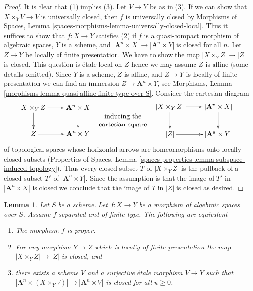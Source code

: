 \documentclass{stacks-project}
\theoremstyle{plain}
\newtheorem{lemma}[subsection]{Lemma}
\theoremstyle{definition}
\theoremstyle{remark}
\numberwithin{equation}{subsection}
\begin{document}
\begin{proof}
\medskip\noindent
It is clear that (1) implies (3). Let $V \to Y$ be as in (3).
If we can show that $X \times_Y V \to V$ is universally closed,
then $f$ is universally closed by
Morphisms of Spaces, Lemma
\ref{spaces-morphisms-lemma-universally-closed-local}.
Thus it suffices to show that $f : X \to Y$ satisfies (2)
if $f$ is a quasi-compact morphism of algebraic spaces,
$Y$ is a scheme, and $|\mathbf{A}^n \times X| \to |\mathbf{A}^n \times Y|$
is closed for all $n$. Let $Z \to Y$ be locally of finite presentation.
We have to show the map $|X \times_Y Z| \to |Z|$ is closed.
This question is \'etale local on $Z$ hence we may assume $Z$
is affine (some details omitted). Since $Y$ is a scheme, $Z$ is affine,
and $Z \to Y$ is locally of finite presentation we can find
an immersion $Z \to \mathbf{A}^n \times Y$, see
Morphisms, Lemma \ref{morphisms-lemma-quasi-affine-finite-type-over-S}.
Consider the cartesian diagram
$$
\vcenter{
\xymatrix{
X \times_Y Z \ar[d] \ar[r] & \mathbf{A}^n \times X \ar[d] \\
Z \ar[r] & \mathbf{A}^n \times Y
}
}
\quad
\begin{matrix}
\text{inducing the} \\
\text{cartesian square}
\end{matrix}
\quad
\vcenter{
\xymatrix{
|X \times_Y Z| \ar[d] \ar[r] & |\mathbf{A}^n \times X| \ar[d] \\
|Z| \ar[r] & |\mathbf{A}^n \times Y|
}
}
$$
of topological spaces whose horizontal arrows are homeomorphisms
onto locally closed subsets (Properties of Spaces, Lemma
\ref{spaces-properties-lemma-subspace-induced-topology}).
Thus every closed subset $T$
of $|X \times_Y Z|$ is the pullback of a closed subset $T'$ of
$|\mathbf{A}^n \times Y|$. Since the assumption is that the image
of $T'$ in $|\mathbf{A}^n \times X|$ is closed we conclude that
the image of $T$ in $|Z|$ is closed as desired.
\end{proof}

\begin{lemma}
\label{lemma-limited-base-change}
Let $S$ be a scheme. Let $f : X \to Y$ be a
morphism of algebraic spaces over $S$.
Assume $f$ separated and of finite type.
The following are equivalent
\begin{enumerate}
\item The morphism $f$ is proper.
\item For any morphism $Y \to Z$ which is locally of finite presentation
the map $|X \times_Y Z| \to |Z|$ is closed, and
\item there exists a scheme $V$ and a surjective \'etale morphism $V \to Y$
such that $|\mathbf{A}^n \times (X \times_Y V)| \to |\mathbf{A}^n \times V|$
is closed for all $n \geq 0$.
\end{enumerate}
\end{lemma}
\end{document}

